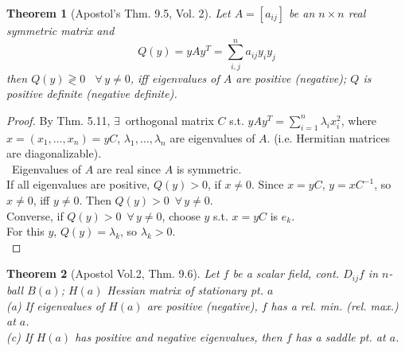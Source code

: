 \documentclass[twoside]{amsart}
\theoremstyle{plain}
\newtheorem{theorem}{Theorem}
\theoremstyle{definition}
\begin{document}
\begin{theorem}[Apostol's Thm. 9.5, Vol. 2] Let $A = [a_{ij}]$ be an $n \times n$ real symmetric matrix and 
\begin{equation}
  Q(y) = y A y^T = \sum_{i,j}^n a_{ij} y_i y_j 
\end{equation}
then $Q(y) \gtrless 0$ \, $\forall \, y \neq 0$, iff eigenvalues of $A$ are positive (negative); $Q$ is positive definite (negative definite).  

\end{theorem}
\begin{proof}
  By Thm. 5.11, $\exists \,$ orthogonal matrix $C$ s.t. $yAy^T = \sum_{i=1}^n \lambda_i x_i^2$, where $x=(x_1,\dots, x_n) = yC$, $\lambda_1, \dots, \lambda_n$ are eigenvalues of $A$.  (i.e. Hermitian matrices are diagonalizable).  \\
\quad \, Eigenvalues of $A$ are real since $A$ is symmetric.  \\

If all eigenvalues are positive, $Q(y) >0$, if $x \neq 0$.  Since $x=yC$, $y = xC^{-1}$, so $x\neq 0$, iff $y\neq 0$.  Then $Q(y) >0$\, $\forall \, y \neq 0$.  \\
\quad Converse, if $Q(y) >0$\, $\forall \, y\neq 0$, choose $y$ s.t. $x=yC$ is $e_k$.  \\
For this $y$, $Q(y) = \lambda_k$, so $\lambda_k >0$.   \\


\end{proof}

\begin{theorem}[Apostol Vol.2, Thm. 9.6] Let $f$ be a scalar field, cont. $D_{ij} f$ in $n$-ball $B(a)$; $H(a)$ Hessian matrix of stationary pt. $a$  \\
(a) If eigenvalues of $H(a)$ are positive (negative), $f$ has a rel. min. (rel. max.) at $a$.  \\
(c) If $H(a)$ has positive and negative eigenvalues, then $f$ has a saddle pt. at $a$.  
\end{theorem}
\end{document}
